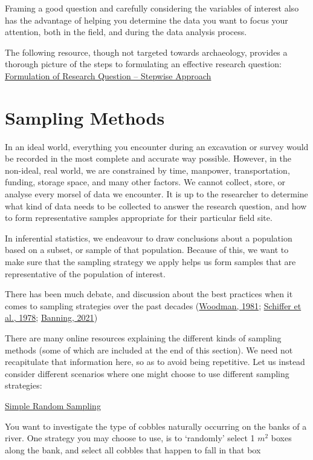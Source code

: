 \documentclass{article}
\begin{document}
Framing a good question and carefully considering the variables of interest also has the advantage of helping you determine the data you want to focus your attention, both in the field, and during the data analysis process. 

The following resource, though not targeted towards archaeology, provides a thorough picture of the steps to formulating an effective research question: \href{https://www.ncbi.nlm.nih.gov/pmc/articles/PMC6322175/}{ Formulation of Research Question – Stepwise Approach}

\section{Sampling Methods}

 In an ideal world, everything you encounter during an excavation or survey would be recorded in the most complete and accurate way possible. However, in the non-ideal, real world, we are constrained by time, manpower, transportation, funding, storage space, and many other factors. We cannot collect, store, or analyse every morsel of data we encounter. It is up to the researcher to determine what kind of data needs to be collected to answer the research question, and how to form representative samples appropriate for their particular field site.

In inferential statistics, we endeavour to draw conclusions about a population based on a subset, or sample of that population. Because of this, we want to make sure that the sampling strategy we apply helps us form samples that are representative of the population of interest.

There has been much debate, and discussion about the best practices when it comes to sampling strategies over the past decades (\protect\hyperlink{woodman}{Woodman, 1981}; \protect\hyperlink{schiffer}{Schiffer et al., 1978}; \protect\hyperlink{banning}{Banning, 2021})

There are many online resources explaining the different kinds of sampling methods (some of which are included at the end of this section). We need not recapitulate that information here, so as to avoid being repetitive. Let us instead consider different scenarios where one might choose to use different sampling strategies:

\underline{Simple Random Sampling}

You want to investigate the type of cobbles naturally occurring on the banks of a river. One strategy you may choose to use, is to ‘randomly’ select 1 \(m^2\) boxes along the bank, and select all cobbles that happen to fall in that box
\end{document}
